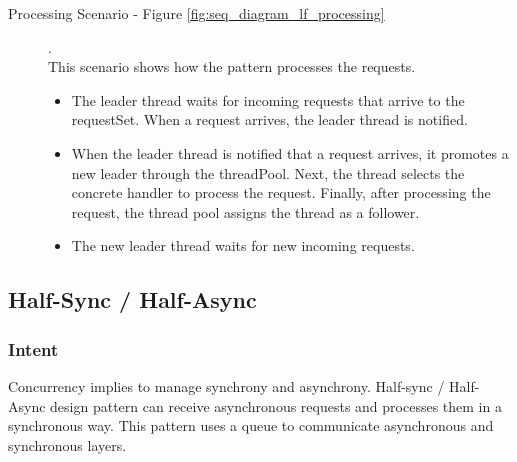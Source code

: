 \begin{description}
	
	
	\item[Processing Scenario - Figure \ref{fig:seq_diagram_lf_processing}].\\
	
	This scenario shows how the pattern processes the requests.
	
	\begin{itemize}
		\item  The leader thread waits for incoming requests that arrive to the requestSet. When a request arrives, the leader thread is notified.
		
		\item  When the leader thread is notified that a request arrives, it promotes a new leader through the threadPool. Next, the thread selects the concrete handler to process the request. Finally, after processing the request, the thread pool assigns the thread as a follower.
		
		\item  The new leader thread waits for new incoming requests.
	\end{itemize}
	
\end{description}

\subsection{Half-Sync / Half-Async}

\subsubsection{Intent}

Concurrency implies to manage synchrony and asynchrony. Half-sync / Half-Async design pattern can receive asynchronous requests and processes them in a synchronous way. This pattern uses a queue to communicate asynchronous and synchronous layers.


